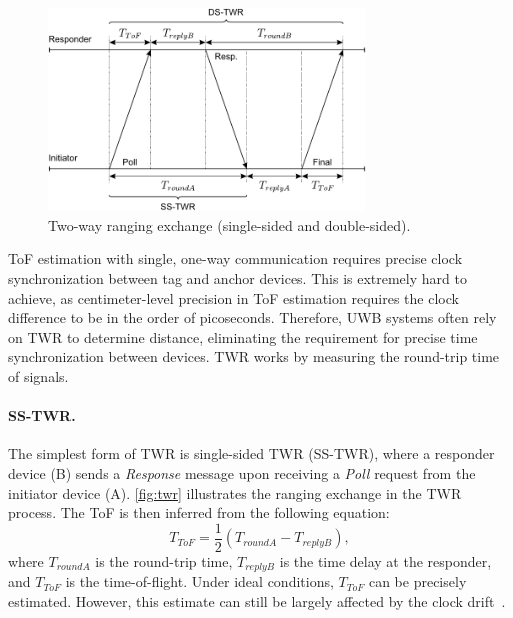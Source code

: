 \begin{figure}[tbh]
\includegraphics[width=0.75\textwidth]{Figures/theoretical_background/twr.pdf}
\centering
\caption[Two-way ranging exchange.]{Two-way ranging exchange (single-sided and double-sided).}
\label{fig:twr}
\end{figure}

ToF estimation with single, one-way communication requires precise clock synchronization between tag and anchor devices. This is extremely hard to achieve, as centimeter-level precision in ToF estimation requires the clock difference to be in the order of picoseconds. Therefore, UWB systems often rely on TWR to determine distance, eliminating the requirement for precise time synchronization between devices. TWR works by measuring the round-trip time of signals.

\paragraph{SS-TWR.}
The simplest form of TWR is single-sided TWR (SS-TWR), where a responder device (B) sends a \emph{Response} message upon receiving a \emph{Poll} request from the initiator device (A). \autoref{fig:twr} illustrates the ranging exchange in the TWR process. The ToF is then inferred from the following equation:
\begin{equation}\label{tof-ss}
T_{ToF} = \frac{1}{2} (T_{roundA} - T_{replyB}),
\end{equation}
where $T_{roundA}$ is the round-trip time, $T_{replyB}$ is the time delay at the responder, and $T_{ToF}$ is the time-of-flight. Under ideal conditions, $T_{ToF}$ can be precisely estimated. However, this estimate can still be largely affected by the clock drift~\cite{neirynck2016alternative}.

